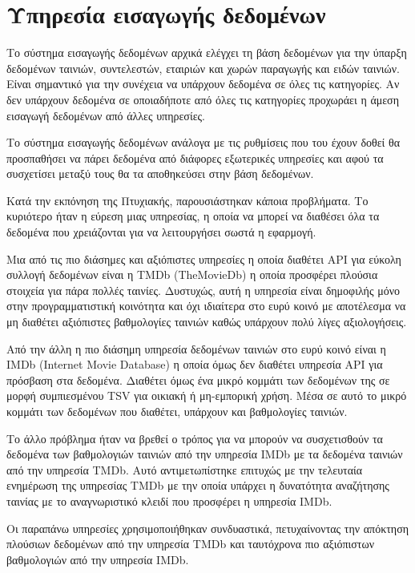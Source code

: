 \section{Υπηρεσία εισαγωγής δεδομένων}

Το σύστημα εισαγωγής δεδομένων αρχικά ελέγχει τη βάση δεδομένων για την ύπαρξη δεδομένων ταινιών, συντελεστών, εταιριών και χωρών παραγωγής και ειδών ταινιών. Είναι σημαντικό για την συνέχεια να υπάρχουν δεδομένα σε όλες τις κατηγορίες. Αν δεν υπάρχουν δεδομένα σε οποιαδήποτε από όλες τις κατηγορίες προχωράει η άμεση εισαγωγή δεδομένων από άλλες υπηρεσίες. 

Το σύστημα εισαγωγής δεδομένων ανάλογα με τις ρυθμίσεις που του έχουν δοθεί θα προσπαθήσει να πάρει δεδομένα από διάφορες εξωτερικές υπηρεσίες και αφού τα συσχετίσει μεταξύ τους θα τα αποθηκεύσει στην βάση δεδομένων. 

Κατά την εκπόνηση της Πτυχιακής, παρουσιάστηκαν κάποια προβλήματα. Το κυριότερο ήταν η εύρεση μιας υπηρεσίας, η οποία να μπορεί να διαθέσει όλα τα δεδομένα που χρειάζονται για να λειτουργήσει σωστά η εφαρμογή. 

Μια από τις πιο διάσημες και αξιόπιστες υπηρεσίες η οποία διαθέτει API για εύκολη συλλογή δεδομένων είναι η TMDb (TheMovieDb) η οποία προσφέρει πλούσια στοιχεία για πάρα πολλές ταινίες. Δυστυχώς, αυτή η υπηρεσία είναι δημοφιλής μόνο στην προγραμματιστική κοινότητα και όχι ιδιαίτερα στο ευρύ κοινό με αποτέλεσμα να μη διαθέτει αξιόπιστες βαθμολογίες ταινιών καθώς υπάρχουν πολύ λίγες αξιολογήσεις. 

Από την άλλη η πιο διάσημη υπηρεσία δεδομένων ταινιών στο ευρύ κοινό είναι η IMDb (Internet Movie Database) η οποία όμως δεν διαθέτει υπηρεσία API για πρόσβαση στα δεδομένα. Διαθέτει όμως ένα μικρό κομμάτι των δεδομένων της σε μορφή συμπιεσμένου TSV για οικιακή ή μη-εμπορική χρήση. Μέσα σε αυτό το μικρό κομμάτι των δεδομένων που διαθέτει, υπάρχουν και βαθμολογίες ταινιών. 

Το άλλο πρόβλημα ήταν να βρεθεί ο τρόπος για να μπορούν να συσχετισθούν τα δεδομένα των βαθμολογιών ταινιών από την υπηρεσία IMDb με τα δεδομένα ταινιών από την υπηρεσία TMDb. Αυτό αντιμετωπίστηκε επιτυχώς
με την τελευταία ενημέρωση της υπηρεσίας TMDb με την οποία υπάρχει η δυνατότητα αναζήτησης ταινίας με το αναγνωριστικό κλειδί που προσφέρει η υπηρεσία IMDb.

Οι παραπάνω υπηρεσίες χρησιμοποιήθηκαν συνδυαστικά, πετυχαίνοντας την απόκτηση πλούσιων δεδομένων από την υπηρεσία TMDb και ταυτόχρονα πιο αξιόπιστων βαθμολογιών από την υπηρεσία IMDb.


